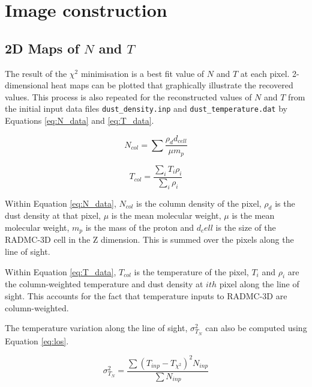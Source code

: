 \documentclass{report}
\begin{document}
\section{Image construction}

\subsection{2D Maps of $N$ and $T$}
The result of the $\chi^{2}$ minimisation is a best fit value of $N$ and $T$ at each pixel. 2-dimensional heat maps can be plotted that graphically illustrate the recovered values. This process is also repeated for the reconstructed values of $N$ and $T$ from the initial input data files \texttt{dust\_density.inp} and \texttt{dust\_temperature.dat} by Equations \ref{eq:N_data} and \ref{eq:T_data}.

\noindent\begin{minipage}{.5\linewidth}
\begin{equation}
  N_{col} = \sum{\frac{\rho_{d}d_{cell}}{\mu m_{p}}}
\end{equation} \label{eq:N_data}
\end{minipage}%
\begin{minipage}{.5\linewidth}
\begin{equation}
  T_{col} = \frac{\sum_{i} T_{i} \rho_{i}}{\sum_{i} \rho_{i}}
\end{equation} \label{eq:T_data}
\end{minipage}

Within Equation \ref{eq:N_data}, $N_{col}$ is the column density of the pixel, $\rho_{d}$ is the dust density at that pixel, $\mu$ is the mean molecular weight, $\mu$ is the mean molecular weight, $m_{p}$ is the mass of the proton and $d_cell$ is the size of the RADMC-3D cell in the Z dimension. This is summed over the pixels along the line of sight.

Within Equation \ref{eq:T_data}, $T_{col}$ is the temperature of the pixel, $T_{i}$ and $\rho_{i}$ are the column-weighted temperature and dust density at $ith$ pixel along the line of sight. This accounts for the fact that temperature inputs to RADMC-3D are column-weighted.

The temperature variation along the line of sight, $\sigma_{T_{N}}^{2}$ can also be computed using Equation \ref{eq:los}.

\begin{equation}
  \sigma_{T_{N}}^{2} = \frac{\sum{(T_{inp}-T_{\chi^{2}})^{2}}N_{inp}}{\sum{N_{inp}}}
   \label{eq:los}
\end{equation}
\end{document}
